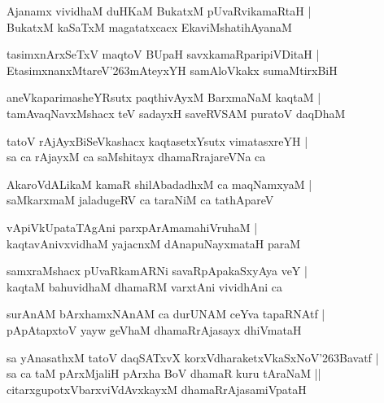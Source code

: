 \documentclass[twoside,12pt,openright]{book}
\def\S{\char'263}
\newcounter{shloka}[chapter]
\begin{document}
\begin{shloka}%
Ajanamx vividhaM duHKaM BukatxM pUvaRvikamaRtaH |\\
BukatxM kaSaTxM magatatxcacx EkaviMshatihAyanaM 
\end{shloka}

\begin{shloka}%
tasimxnArxSeTxV maqtoV BUpaH savxkamaRparipiVDitaH |\\
EtasimxnanxMtareV\S mAteyxYH samAloVkakx sumaMtirxBiH 
\end{shloka}

\begin{shloka}%
aneVkaparimasheYRsutx paqthivAyxM BarxmaNaM kaqtaM |\\
tamAvaqNavxMshacx teV sadayxH saveRVSAM puratoV daqDhaM 
\end{shloka}

\begin{shloka}%
tatoV rAjAyxBiSeVkashacx kaqtasetxYsutx vimatasxreYH |\\
sa ca rAjayxM ca saMshitayx dhamaRrajareVNa ca
\end{shloka}

\begin{shloka}%
AkaroVdALikaM kamaR shilAbadadhxM ca maqNamxyaM |\\
saMkarxmaM jaladugeRV ca taraNiM ca tathApareV 
\end{shloka}

\begin{shloka}%
vApiVkUpataTAgAni parxpArAmamahiVruhaM |\\
kaqtavAnivxvidhaM yajacnxM dAnapuNayxmataH paraM
\end{shloka}

\begin{shloka}%
samxraMshacx pUvaRkamARNi savaRpApakaSxyAya veY |\\
kaqtaM bahuvidhaM dhamaRM varxtAni vividhAni ca 
\end{shloka}

\begin{shloka}%
surAnAM bArxhamxNAnAM ca durUNAM ceYva tapaRNAtf |\\
pApAtapxtoV yayw geVhaM dhamaRrAjasayx dhiVmataH
\end{shloka}

\begin{shloka}%
sa yAnasathxM tatoV daqSATxvX korxVdharaketxVkaSxNoV\S Bavatf |\\
sa ca taM pArxMjaliH pArxha BoV dhamaR kuru tAraNaM ||\\
citarxgupotxVbarxviVdAvxkayxM dhamaRrAjasamiVpataH  
\end{shloka}
\end{document}
